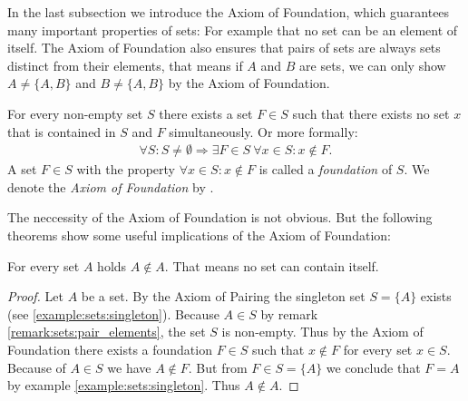 In the last subsection we introduce the Axiom of Foundation, which guarantees many important properties of sets: For example that no set can be an element of itself. The Axiom of Foundation also ensures that pairs of sets are always sets distinct from their elements, that means if $A$ and $B$ are sets, we can only show $A\neq \{A,B\}$ and $B\neq \{A,B\}$ by the Axiom of Foundation.

\begin{axiom}[Foundation]
    For every non-empty set $S$ there exists a set $F\in S$ such that there exists no set $x$ that is contained in $S$ and $F$ simultaneously. Or more formally:
    \begin{align}\forall S\colon S\neq\emptyset\Rightarrow \exists F\in S\ \forall x\in S\colon x\notin F.\end{align}
    A set $F\in S$ with the property $\forall x\in S\colon x\notin F$ is called a \emph{foundation} of $S$. We denote the \emph{Axiom of Foundation} by .
\end{axiom}

\begin{remarks}
    \begin{remarkenumerate}
        \item 
    \end{remarkenumerate}
\end{remarks}

The neccessity of the Axiom of Foundation is not obvious. But the following theorems show some useful implications of the Axiom of Foundation:

\begin{theorem}\label{theorem:sets:set_not_in_set}
    For every set $A$ holds $A\notin A$. That means no set can contain itself.
\end{theorem}
\begin{proof}
    Let $A$ be a set. By the Axiom of Pairing the singleton set $S=\{A\}$ exists (see \ref{example:sets:singleton}). Because $A\in S$ by remark \ref{remark:sets:pair_elements}, the set $S$ is non-empty. Thus by the Axiom of Foundation there exists a foundation $F\in S$ such that $x\notin F$ for every set $x\in S$. Because of $A\in S$ we have $A\notin F$. But from $F\in S=\{A\}$ we conclude that $F=A$ by example \ref{example:sets:singleton}. Thus $A\notin A$.
\end{proof}

